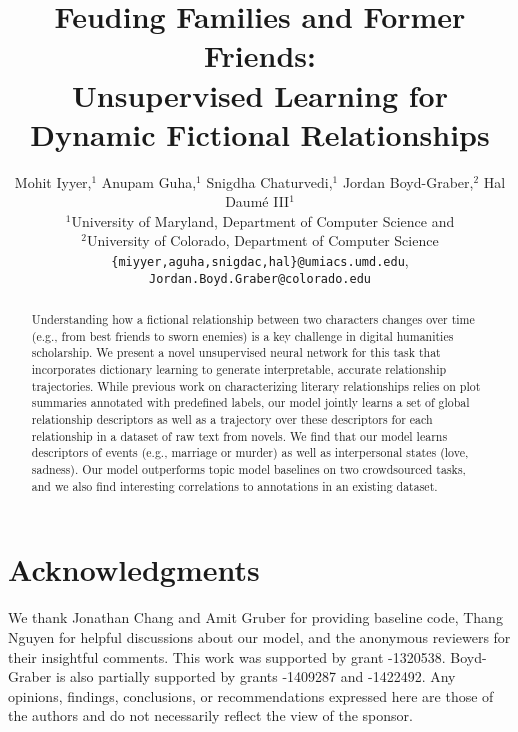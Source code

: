 \documentclass[11pt,letterpaper]{article}
\title{Feuding Families and Former Friends:\\Unsupervised Learning for Dynamic Fictional Relationships}
\author{
  Mohit Iyyer,$^{1}$ Anupam Guha,$^{1}$ Snigdha Chaturvedi,$^{1}$ Jordan Boyd-Graber,$^{2}$ Hal Daumé III$^{1}$\\
  $^1$University of Maryland, Department of Computer Science and \abr{umiacs}\\
        $^2$University of Colorado, Department of Computer Science \\
  {\tt \{miyyer,aguha,snigdac,hal\}@umiacs.umd.edu}, \\
  {\tt Jordan.Boyd.Graber@colorado.edu} \\
}
\begin{document}
\maketitle

\begin{abstract}
  Understanding how a fictional relationship between two characters changes over
  time (e.g., from best friends to sworn enemies) is a key challenge in digital
  humanities scholarship.  We present a novel unsupervised neural network for
  this task that incorporates dictionary learning to generate interpretable,
  accurate relationship trajectories. While previous work on characterizing
  literary relationships relies on plot summaries annotated with predefined
  labels, our model jointly learns a set of global relationship descriptors as
  well as a trajectory over these descriptors for each relationship in a dataset
  of raw text from novels. We find that our model learns descriptors of events
  (e.g., marriage or murder) as well as interpersonal states (love,
  sadness). Our model outperforms topic model baselines on two crowdsourced
  tasks, and we also find interesting correlations to annotations in an existing
  dataset.
\end{abstract}









\section*{Acknowledgments}

We thank Jonathan Chang and Amit Gruber for providing baseline code, Thang Nguyen for helpful discussions about our model, and the anonymous reviewers for their insightful comments.
This work was supported by  grant -1320538.
Boyd-Graber is also partially supported by  grants
-1409287 and -1422492. Any opinions, findings,
conclusions, or recommendations expressed here are those of the
authors and do not necessarily reflect the view of the sponsor.

\clearpage



\end{document}
